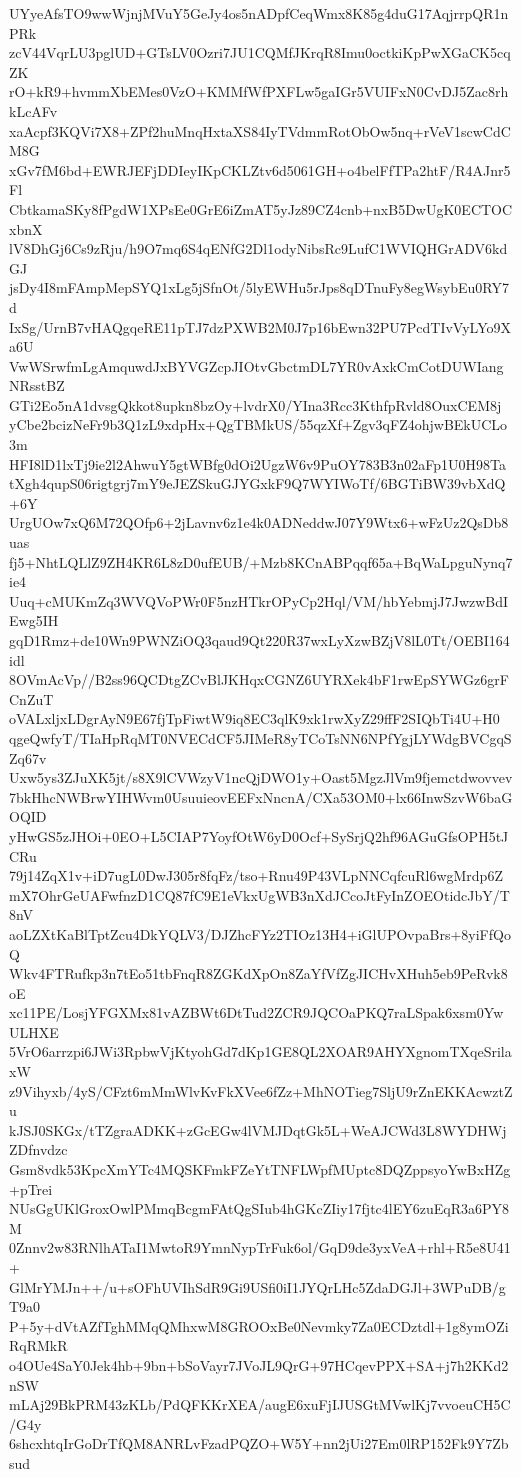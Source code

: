 UYyeAfsTO9wwWjnjMVuY5GeJy4os5nADpfCeqWmx8K85g4duG17AqjrrpQR1nPRk
zcV44VqrLU3pglUD+GTsLV0Ozri7JU1CQMfJKrqR8Imu0octkiKpPwXGaCK5cqZK
rO+kR9+hvmmXbEMes0VzO+KMMfWfPXFLw5gaIGr5VUIFxN0CvDJ5Zac8rhkLcAFv
xaAcpf3KQVi7X8+ZPf2huMnqHxtaXS84IyTVdmmRotObOw5nq+rVeV1scwCdCM8G
xGv7fM6bd+EWRJEFjDDIeyIKpCKLZtv6d5061GH+o4belFfTPa2htF/R4AJnr5Fl
CbtkamaSKy8fPgdW1XPsEe0GrE6iZmAT5yJz89CZ4cnb+nxB5DwUgK0ECTOCxbnX
lV8DhGj6Cs9zRju/h9O7mq6S4qENfG2Dl1odyNibsRc9LufC1WVIQHGrADV6kdGJ
jsDy4I8mFAmpMepSYQ1xLg5jSfnOt/5lyEWHu5rJps8qDTnuFy8egWsybEu0RY7d
IxSg/UrnB7vHAQgqeRE11pTJ7dzPXWB2M0J7p16bEwn32PU7PcdTIvVyLYo9Xa6U
VwWSrwfmLgAmquwdJxBYVGZcpJIOtvGbctmDL7YR0vAxkCmCotDUWIangNRsstBZ
GTi2Eo5nA1dvsgQkkot8upkn8bzOy+lvdrX0/YIna3Rcc3KthfpRvld8OuxCEM8j
yCbe2bcizNeFr9b3Q1zL9xdpHx+QgTBMkUS/55qzXf+Zgv3qFZ4ohjwBEkUCLo3m
HFI8lD1lxTj9ie2l2AhwuY5gtWBfg0dOi2UgzW6v9PuOY783B3n02aFp1U0H98Ta
tXgh4qupS06rigtgrj7mY9eJEZSkuGJYGxkF9Q7WYIWoTf/6BGTiBW39vbXdQ+6Y
UrgUOw7xQ6M72QOfp6+2jLavnv6z1e4k0ADNeddwJ07Y9Wtx6+wFzUz2QsDb8uas
fj5+NhtLQLlZ9ZH4KR6L8zD0ufEUB/+Mzb8KCnABPqqf65a+BqWaLpguNynq7ie4
Uuq+cMUKmZq3WVQVoPWr0F5nzHTkrOPyCp2Hql/VM/hbYebmjJ7JwzwBdIEwg5IH
gqD1Rmz+de10Wn9PWNZiOQ3qaud9Qt220R37wxLyXzwBZjV8lL0Tt/OEBI164idl
8OVmAcVp//B2ss96QCDtgZCvBlJKHqxCGNZ6UYRXek4bF1rwEpSYWGz6grFCnZuT
oVALxljxLDgrAyN9E67fjTpFiwtW9iq8EC3qlK9xk1rwXyZ29ffF2SIQbTi4U+H0
qgeQwfyT/TIaHpRqMT0NVECdCF5JIMeR8yTCoTsNN6NPfYgjLYWdgBVCgqSZq67v
Uxw5ys3ZJuXK5jt/s8X9lCVWzyV1ncQjDWO1y+Oast5MgzJlVm9fjemctdwovvev
7bkHhcNWBrwYIHWvm0UsuuieovEEFxNncnA/CXa53OM0+lx66InwSzvW6baGOQID
yHwGS5zJHOi+0EO+L5CIAP7YoyfOtW6yD0Ocf+SySrjQ2hf96AGuGfsOPH5tJCRu
79j14ZqX1v+iD7ugL0DwJ305r8fqFz/tso+Rnu49P43VLpNNCqfcuRl6wgMrdp6Z
mX7OhrGeUAFwfnzD1CQ87fC9E1eVkxUgWB3nXdJCcoJtFyInZOEOtidcJbY/T8nV
aoLZXtKaBlTptZcu4DkYQLV3/DJZhcFYz2TIOz13H4+iGlUPOvpaBrs+8yiFfQoQ
Wkv4FTRufkp3n7tEo51tbFnqR8ZGKdXpOn8ZaYfVfZgJICHvXHuh5eb9PeRvk8oE
xc11PE/LosjYFGXMx81vAZBWt6DtTud2ZCR9JQCOaPKQ7raLSpak6xsm0YwULHXE
5VrO6arrzpi6JWi3RpbwVjKtyohGd7dKp1GE8QL2XOAR9AHYXgnomTXqeSrilaxW
z9Vihyxb/4yS/CFzt6mMmWlvKvFkXVee6fZz+MhNOTieg7SljU9rZnEKKAcwztZu
kJSJ0SKGx/tTZgraADKK+zGcEGw4lVMJDqtGk5L+WeAJCWd3L8WYDHWjZDfnvdzc
Gsm8vdk53KpcXmYTc4MQSKFmkFZeYtTNFLWpfMUptc8DQZppsyoYwBxHZg+pTrei
NUsGgUKlGroxOwlPMmqBcgmFAtQgSIub4hGKcZIiy17fjtc4lEY6zuEqR3a6PY8M
0Znnv2w83RNlhATaI1MwtoR9YmnNypTrFuk6ol/GqD9de3yxVeA+rhl+R5e8U41+
GlMrYMJn++/u+sOFhUVIhSdR9Gi9USfi0iI1JYQrLHc5ZdaDGJl+3WPuDB/gT9a0
P+5y+dVtAZfTghMMqQMhxwM8GROOxBe0Nevmky7Za0ECDztdl+1g8ymOZiRqRMkR
o4OUe4SaY0Jek4hb+9bn+bSoVayr7JVoJL9QrG+97HCqevPPX+SA+j7h2KKd2nSW
mLAj29BkPRM43zKLb/PdQFKKrXEA/augE6xuFjIJUSGtMVwlKj7vvoeuCH5C/G4y
6shcxhtqIrGoDrTfQM8ANRLvFzadPQZO+W5Y+nn2jUi27Em0lRP152Fk9Y7Zbsud
